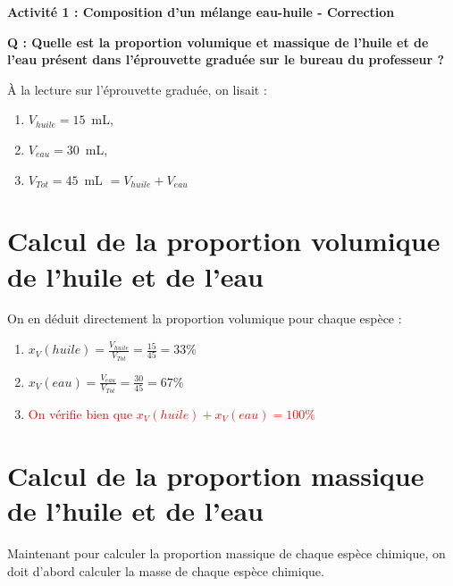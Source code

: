 \renewcommand{\thesubsection}{\textcolor{red}{\Roman{section}.\arabic{subsection}}}
\renewcommand{\thesubsubsection}{\textcolor{red}{\Roman{section}.\arabic{subsection}.\alph{subsubsection}}}

\setcounter{section}{0}
\setcounter{document}{0}
\sndEnTeteActUn

\begin{center}
\begin{mdframed}[style=titr, leftmargin=60pt, rightmargin=60pt, innertopmargin=7pt, innerbottommargin=7pt, innerrightmargin=8pt, innerleftmargin=8pt]

\begin{center}
\large{\textbf{Activité 1 : Composition d'un mélange eau-huile - \textbf{Correction}}}
\end{center}

\end{mdframed}
\end{center}
\begin{Large}{\textbf{Q : Quelle est la proportion volumique et massique de l'huile et de l'eau présent dans l'éprouvette graduée sur le bureau du professeur ?}} \end{Large}
\newline

\`{A} la lecture sur l'éprouvette graduée, on lisait :
\begin{enumerate}
    \item $V_{huile}=15$~mL,
    \item $V_{eau}=30$~mL,
    \item $V_{Tot}= 45$~mL $=V_{huile}+V_{eau}$
\end{enumerate}

\section{Calcul de la proportion volumique de l'huile et de l'eau}
On en déduit directement la proportion volumique pour chaque espèce :
\begin{enumerate}
    \item $x_V(huile)=\frac{V_{huile}}{V_{Tot}}=\frac{15}{45}=33\%$
    \item $x_V(eau)=\frac{V_{eau}}{V_{Tot}}=\frac{30}{45}=67\%$
    \item \textcolor{red}{On vérifie bien que $x_V(huile)+x_V(eau)=100\%$}
\end{enumerate}

\section{Calcul de la proportion massique de l'huile et de l'eau}
Maintenant pour calculer la proportion massique de chaque espèce chimique, on doit d'abord calculer la masse de chaque espèce chimique. \\

